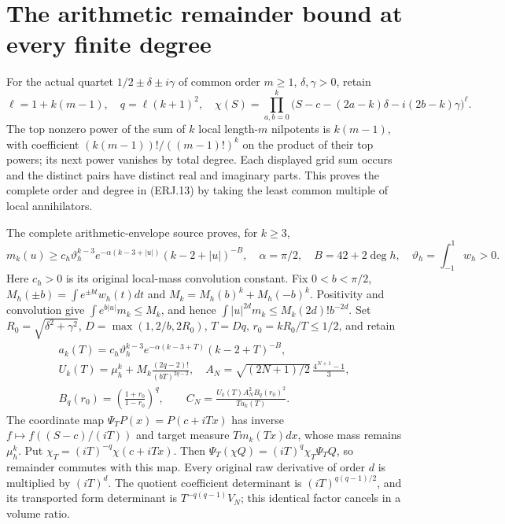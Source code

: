\documentclass[11pt]{article}
\begin{document}
\section{The arithmetic remainder bound at every finite degree}
For the actual quartet $1/2\pm\delta\pm i\gamma$ of common order
$m\ge1$, $\delta,\gamma>0$, retain
\[
 \ell=1+k(m-1),\quad q=\ell(k+1)^2,\quad
 \chi(S)=\prod_{a,b=0}^k
 \bigl(S-c-(2a-k)\delta-i(2b-k)\gamma\bigr)^\ell.
 \tag{ERJ.13}
\]
The top nonzero power of the sum of $k$ local length-$m$ nilpotents
is $k(m-1)$, with coefficient $(k(m-1))!/((m-1)!)^k$ on the product
of their top powers; its next power vanishes by total degree. Each
displayed grid sum occurs and the distinct pairs have distinct real
and imaginary parts. This proves the complete order and degree in
(ERJ.13) by taking the least common multiple of local annihilators.

The complete arithmetic-envelope source proves, for $k\ge3$,
\[
 m_k(u)\ge c_h\vartheta_h^{k-3}
 e^{-\alpha(k-3+|u|)}(k-2+|u|)^{-B},\quad
 \alpha=\pi/2,\quad B=42+2\deg h,\quad
 \vartheta_h=\int_{-1}^1w_h>0.\tag{ERJ.14}
\]
Here $c_h>0$ is its original local-mass convolution constant.
Fix $0<b<\pi/2$, $M_h(\pm b)=\int e^{\pm bt}w_h(t)dt$ and
$M_k=M_h(b)^k+M_h(-b)^k$. Positivity and convolution give
$\int e^{b|u|}m_k\le M_k$, and hence
$\int |u|^{2d}m_k\le M_k(2d)!b^{-2d}$.
Set $R_0=\sqrt{\delta^2+\gamma^2}$, $D=\max(1,2/b,2R_0)$,
$T=Dq$, $r_0=kR_0/T\le1/2$, and retain
\[
\begin{gathered}
 a_k(T)=c_h\vartheta_h^{k-3}e^{-\alpha(k-3+T)}(k-2+T)^{-B},\\
 U_k(T)=\mu_h^k+M_k\frac{(2q-2)!}{(bT)^{2q-2}},\quad
 A_N=\sqrt{(2N+1)/2}\,\frac{4^{N+1}-1}{3},\\
 B_q(r_0)=\left(\frac{1+r_0}{1-r_0}\right)^q,\qquad
 C_N=\frac{U_k(T)A_N^2B_q(r_0)^2}{T a_k(T)}.
\end{gathered}\tag{ERJ.15}
\]
The coordinate map $\Psi_TP(x)=P(c+iTx)$ has inverse
$f\mapsto f((S-c)/(iT))$ and target measure $T m_k(Tx)dx$,
whose mass remains $\mu_h^k$. Put
$\chi_T=(iT)^{-q}\chi(c+iTx)$. Then
$\Psi_T(\chi Q)=(iT)^q\chi_T\Psi_TQ$, so remainder commutes
with this map. Every original raw derivative of order $d$ is multiplied
by $(iT)^d$. The quotient coefficient determinant is
$(iT)^{q(q-1)/2}$, and its transported form determinant is
$T^{-q(q-1)}V_N$; this identical factor cancels in a volume ratio.
\end{document}
